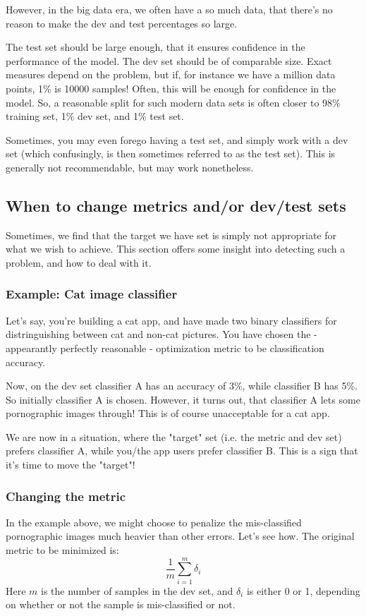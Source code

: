 \documentclass[12pt, a4paper]{article}
\numberwithin{equation}{section}
\begin{document}
However, in the big data era, we often have a so much data, that there's no reason to make the dev and test percentages so large.

The test set should be large enough, that it ensures confidence in the performance of the model. The dev set should be of comparable size. Exact measures depend on the problem, but if, for instance we have a million data points, 1\% is 10000 samples! Often, this will be enough for confidence in the model. So, a reasonable split for such modern data sets is often closer to 98\% training set, 1\% dev set, and 1\% test set.

Sometimes, you may even forego having a test set, and simply work with a dev set (which confusingly, is then sometimes referred to as the test set). This is generally not recommendable, but may work nonetheless.

\subsection{When to change metrics and/or dev/test sets}
Sometimes, we find that the target we have set is simply not appropriate for what we wish to achieve. This section offers some insight into detecting such a problem, and how to deal with it.

\subsubsection{Example: Cat image classifier}
Let's say, you're building a cat app, and have made two binary classifiers for distringuishing between cat and non-cat pictures. You have chosen the - appearantly perfectly reasonable - optimization metric to be classification accuracy.

Now, on the dev set classifier A has an accuracy of 3\%, while classifier B has 5\%. So initially classifier A is chosen. However, it turns out, that classifier A lets some pornographic images through! This is of course unacceptable for a cat app.

We are now in a situation, where the "target" set (i.e. the metric and dev set) prefers classifier A, while you/the app users prefer classifier B. This is a sign that it's time to move the "target"!

\subsubsection{Changing the metric}
In the example above, we might choose to penalize the mis-classified pornographic images much heavier than other errors. Let's see how. The original metric to be minimized is:
\begin{equation}
\frac{1}{m}\sum_{i=1}^m\delta_i
\end{equation}
Here $m$ is the number of samples in the dev set, and $\delta_i$ is either 0 or 1, depending on whether or not the sample is mis-classified or not.
\end{document}
